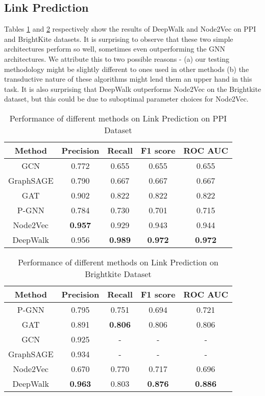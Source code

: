 \documentclass[sigconf]{acmart}
\begin{document}
\subsection{Link Prediction}
Tables \ref{tab:link_prediction_ppi} and \ref{tab:link_prediction_brightkite} respectively show the results of DeepWalk and Node2Vec on PPI and BrightKite datasets. It is surprising to observe that these two simple architectures perform so well, sometimes even outperforming the GNN architectures. We attribute this to two possible reasons - (a) our testing methodology might be slightly different to ones used in other methods (b) the transductive nature of these algorithms might lend them an upper hand in this task. It is also surprising that DeepWalk outperforms Node2Vec on the Brightkite dataset, but this could be due to suboptimal parameter choices for Node2Vec. 
\begin{table}[H]
    \centering
    \begin{tabular}{|c|c|c|c|c|}
    \hline
        \textbf{Method} & \textbf{Precision} & \textbf{Recall} & \textbf{F1 score} & \textbf{ROC AUC} \\
        \hline
        GCN	&	0.772&	0.655&	0.655&	0.655\\
        GraphSAGE	&	0.790&	0.667&	0.667&	0.667\\
        GAT & 0.902&	0.822&	0.822&	0.822\\
        P-GNN & 0.784	& 0.730 &	0.701	& 0.715\\
        \hline
         Node2Vec & \textbf{0.957} & 0.929 & 0.943 & 0.944\\
         DeepWalk & 0.956 & \textbf{0.989} & \textbf{0.972} & \textbf{0.972}\\
         \hline
    \end{tabular}
    \caption{Performance of different methods on Link Prediction on PPI Dataset}
    \label{tab:link_prediction_ppi}
\end{table}

\begin{table}[H]
    \centering
    \begin{tabular}{|c|c|c|c|c|}
    \hline
        \textbf{Method} & \textbf{Precision} & \textbf{Recall} & \textbf{F1 score} & \textbf{ROC AUC} \\
        \hline
        P-GNN & 0.795	& 0.751	& 0.694& 	0.721\\
        GAT	& 0.891 &	\textbf{0.806}&	0.806&	0.806\\
        GCN	& 0.925	& -	& -	& - \\ 	
        GraphSAGE	& 0.934 & -&-&-\\	
        \hline
         Node2Vec & 0.670 & 0.770 & 0.717 & 0.696\\
         DeepWalk & \textbf{0.963} & 0.803 & \textbf{0.876} & \textbf{0.886}\\
         \hline
    \end{tabular}
    \caption{Performance of different methods on Link Prediction on Brightkite Dataset}
    \label{tab:link_prediction_brightkite}
\end{table}
\end{document}
